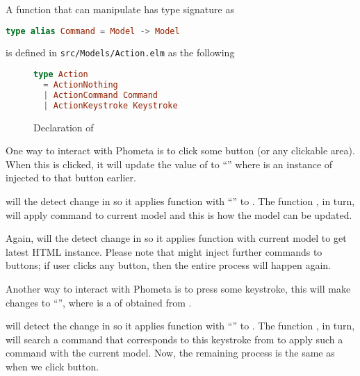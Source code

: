 \documentclass[master.tex]{subfiles}
\begin{document}
A function that can manipulate  has type signature as
\begin{lstlisting}[language=elm]
type alias Command = Model -> Model
\end{lstlisting}

 is defined in \texttt{src/Models/Action.elm}
as the following

\begin{figure}[H]
\begin{framed}
\begin{lstlisting}[language=elm]
type Action
  = ActionNothing
  | ActionCommand Command
  | ActionKeystroke Keystroke
\end{lstlisting}
\end{framed}
\caption{Declaration of }
\label{fig:implementation-action}
\end{figure}

One way to interact with Phometa is to click some button (or any clickable
area). When this is clicked, it will update the value of 
to ``'' where  is an instance of
 injected to that button earlier.

 will the detect change in  so it
applies function  with ``'' to
. The function , in turn, will apply command
 to current model and this is how the model can be updated.

Again,  will the detect change in  so it
applies function  with current model to get latest HTML instance.
Please note that  might inject further commands to buttons; if user
clicks any button, then the entire process will happen again.

Another way to interact with Phometa is to press some keystroke, this will make
 changes to ``'', where
 is a  of  obtained from
.

 will detect the change in  so it
applies function  with ``'' to
. The function , in turn, will search a
command that corresponds to this keystroke from  to
apply such a command with the current model. Now, the remaining process is the
same as when we click button.
\end{document}
